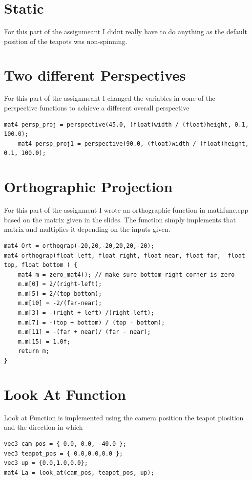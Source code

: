 \documentclass{article}
\begin{document}
\section{Static}
For this part of the assignmeant I didnt really have to do anything as the default position of the teapots was non-spinning.


\section{Two different Perspectives}
For this part of the assignmeant I changed the variables in oone of the perspective functions to achieve a different overall perspective
\begin{lstlisting}
mat4 persp_proj = perspective(45.0, (float)width / (float)height, 0.1, 100.0);
	mat4 persp_proj1 = perspective(90.0, (float)width / (float)height, 0.1, 100.0);
\end{lstlisting}



\section{Orthographic Projection}
For this part of the assignment I wrote an orthographic function in mathfunc.cpp based on the matrix given in the slides. The function simply implements that matrix and multiplies it depending on the inputs given.

\begin{lstlisting}
mat4 Ort = orthograp(-20,20,-20,20,20,-20);
mat4 orthograp(float left, float right, float near, float far,  float top, float bottom ) {	
	mat4 m = zero_mat4(); // make sure bottom-right corner is zero
	m.m[0] = 2/(right-left);
	m.m[5] = 2/(top-bottom);
	m.m[10] = -2/(far-near);
	m.m[3] = -(right + left) /(right-left);
	m.m[7] = -(top + bottom) / (top - bottom);
	m.m[11] = -(far + near)/ (far - near);
	m.m[15] = 1.0f;
	return m;
}
\end{lstlisting}


\section{Look At Function}
Look at Function is implemented using the camera position the teapot piosition and the direction in which 
\begin{lstlisting}
vec3 cam_pos = { 0.0, 0.0, -40.0 };
vec3 teapot_pos = { 0.0,0.0,0.0 };
vec3 up = {0.0,1.0,0.0};
mat4 La = look_at(cam_pos, teapot_pos, up);


\end{lstlisting}
\pagebreak

	
\end{document}
